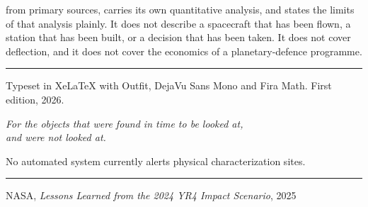 from primary sources, carries its own quantitative analysis, and states the
limits of that analysis plainly. It does not describe a spacecraft that has
been flown, a station that has been built, or a decision that has been taken.
It does not cover deflection, and it does not cover the economics of a
planetary-defence programme.\par
\vspace{10pt}
\noindent\rule{\textwidth}{0.4pt}\par
\vspace{8pt}
{\sffamily\small\color{txtdim}Typeset in XeLaTeX with Outfit, DejaVu Sans Mono
and Fira Math. First edition, 2026.\par}
\clearpage

\clearpage
\thispagestyle{empty}
\vspace*{2.6in}
\begin{center}
{\sffamily\itshape\color{txtdim}
For the objects that were found in time to be looked at,\\[6pt]
and were not looked at.\par}
\end{center}
\vfill
\clearpage

\clearpage
\thispagestyle{plain}
\begin{epigraph}
No automated system currently alerts physical characterization sites.

\rule{1.6in}{0.3pt}

NASA, \emph{Lessons Learned from the 2024 YR4 Impact Scenario}, 2025
\end{epigraph}
\vfill
\clearpage

\clearpage
\thispagestyle{plain}
\tableofcontents
{}
\clearpage

\clearpage
\thispagestyle{plain}
\listoffigures
{}
\clearpage

\clearpage
\thispagestyle{plain}
\listoftables
{}
\clearpage

\setcounter{secnumdepth}{-1}
